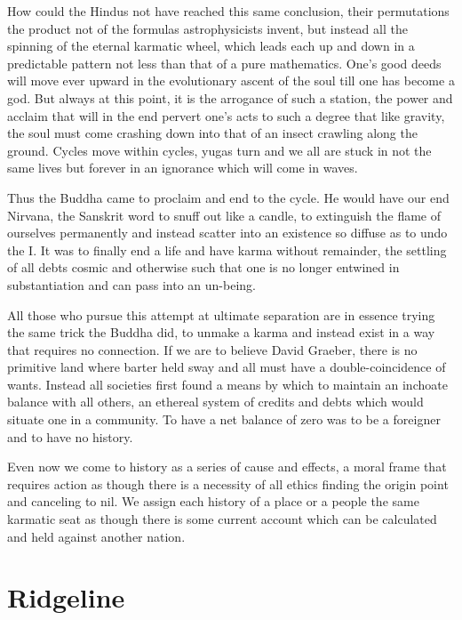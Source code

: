 \documentclass[ebook, 10pt, openright, onecolumn]{memoir}
\begin{document}
How could the Hindus not have reached this same conclusion, their permutations
the product not of the formulas astrophysicists invent, but instead all the
spinning of the eternal karmatic wheel, which leads each up and down in a
predictable pattern not less than that of a pure mathematics.  One's good deeds
will move ever upward in the evolutionary ascent of the soul till one has become
a god.  But always at this point, it is the arrogance of such a station, the
power and acclaim that will in the end pervert one's acts to such a degree that
like gravity, the soul must come crashing down into that of an insect crawling
along the ground.  Cycles move within cycles, yugas turn and we all are stuck in
not the same lives but forever in an ignorance which will come in waves.

Thus the Buddha came to proclaim and end to the cycle.  He would have our end
Nirvana, the Sanskrit word to snuff out like a candle, to extinguish the flame
of ourselves permanently and instead scatter into an existence so diffuse as to
undo the I.  It was to finally end a life and have karma without remainder, the
settling of all debts cosmic and otherwise such that one is no longer entwined
in substantiation and can pass into an un-being.


All those who pursue this attempt at ultimate separation are in essence trying
the same trick the Buddha did, to unmake a karma and instead exist in a way that
requires no connection.  If we are to believe David Graeber, there is no
primitive land where barter held sway and all must have a double-coincidence of
wants.  Instead all societies first found a means by which to maintain an
inchoate balance with all others, an ethereal system of credits and debts which
would situate one in a community.  To have a net balance of zero was to be a
foreigner and to have no history.

Even now we come to history as a series of cause and effects, a moral frame that
requires action as though there is a necessity of all ethics finding the
origin point and canceling to nil.  We assign each history of a place or a
people the same karmatic seat as though there is some current account which can
be calculated and held against another nation.  







\chapter{Ridgeline}
\label{cha:ridgeline}
\end{document}
